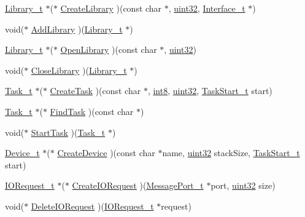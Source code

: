 \begin{DoxyCompactItemize}
\hyperlink{structLibrary__t}{Library\+\_\+t} $\ast$($\ast$ \hyperlink{structIExec__t_a7e8debe7cab7060a0e06ae1e71b9ffb1}{Create\+Library} )(const char $\ast$, \hyperlink{type_8h_acbd4acd0d29e2d6c43104827f77d9cd2}{uint32}, \hyperlink{structInterface__t}{Interface\+\_\+t} $\ast$)
\item 
void($\ast$ \hyperlink{structIExec__t_abf7df7580fee75647be527cda9b1d7ad}{Add\+Library} )(\hyperlink{structLibrary__t}{Library\+\_\+t} $\ast$)
\item 
\hyperlink{structLibrary__t}{Library\+\_\+t} $\ast$($\ast$ \hyperlink{structIExec__t_a5aaad46798a981d39ea50184bedb88d2}{Open\+Library} )(const char $\ast$, \hyperlink{type_8h_acbd4acd0d29e2d6c43104827f77d9cd2}{uint32})
\item 
void($\ast$ \hyperlink{structIExec__t_a917810d97701d7666b6bcefd5fade2d7}{Close\+Library} )(\hyperlink{structLibrary__t}{Library\+\_\+t} $\ast$)
\item 
\hyperlink{structTask__t}{Task\+\_\+t} $\ast$($\ast$ \hyperlink{structIExec__t_a2c21fff11647c6d05903827528522101}{Create\+Task} )(const char $\ast$, \hyperlink{type_8h_aa79c2d3de4fcd200458c406f40b2ae64}{int8}, \hyperlink{type_8h_acbd4acd0d29e2d6c43104827f77d9cd2}{uint32}, \hyperlink{task_8h_aeaa40d24cbae67d9cd352d7006fd9bf6}{Task\+Start\+\_\+t} start)
\item 
\hyperlink{structTask__t}{Task\+\_\+t} $\ast$($\ast$ \hyperlink{structIExec__t_a6003849f8348bceaed6435d63ac4f47f}{Find\+Task} )(const char $\ast$)
\item 
void($\ast$ \hyperlink{structIExec__t_a9dbaa5cb36504fd913d3906781cd524d}{Start\+Task} )(\hyperlink{structTask__t}{Task\+\_\+t} $\ast$)
\item 
\hyperlink{structDevice__t}{Device\+\_\+t} $\ast$($\ast$ \hyperlink{structIExec__t_a39938177ecec3bf1ad125e2e4d30bf6a}{Create\+Device} )(const char $\ast$name, \hyperlink{type_8h_acbd4acd0d29e2d6c43104827f77d9cd2}{uint32} stack\+Size, \hyperlink{task_8h_aeaa40d24cbae67d9cd352d7006fd9bf6}{Task\+Start\+\_\+t} start)
\item 
\hyperlink{structIORequest__t}{I\+O\+Request\+\_\+t} $\ast$($\ast$ \hyperlink{structIExec__t_a655a8fdc54cf3fbcbe83d04b1b34eeab}{Create\+I\+O\+Request} )(\hyperlink{structMessagePort__t}{Message\+Port\+\_\+t} $\ast$port, \hyperlink{type_8h_acbd4acd0d29e2d6c43104827f77d9cd2}{uint32} size)
\item 
void($\ast$ \hyperlink{structIExec__t_a694b5568caaca24b387d990d1e9bddb5}{Delete\+I\+O\+Request} )(\hyperlink{structIORequest__t}{I\+O\+Request\+\_\+t} $\ast$request)

\end{DoxyCompactItemize}
